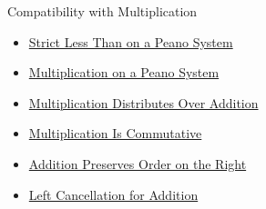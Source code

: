 \begin{topicbox}{Compatibility with Multiplication}
\begin{dependencies}
\begin{itemize}
  \item \hyperref[def:strict-less-than-on-peano-system]{Strict Less Than on a Peano System}
  \item \hyperref[def:multiplication-on-peano-system]{Multiplication on a Peano System}
  \item \hyperref[thm:multiplication-distributes-over-addition]{Multiplication Distributes Over Addition}
  \item \hyperref[thm:multiplication-commutative]{Multiplication Is Commutative}
  \item \hyperref[thm:addition-preserves-order-on-right]{Addition Preserves Order on the Right}
  \item \hyperref[thm:addition-left-cancellation]{Left Cancellation for Addition}
\end{itemize}
\end{dependencies}
\end{topicbox}

